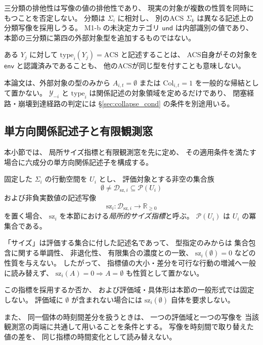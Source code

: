 \begin{remark}[三分類の位置づけ]
\label{rem:object_partition_role}
三分類の排他性は写像の値の排他性であり、
現実の対象が複数の性質を同時にもつことを否定しない。
分類は $\Sigma_i$ に相対し、
別のACS $\Sigma_k$ は異なる記述上の分類写像を採用しうる。
M1-b の未決定カテゴリ $\mathsf{und}$ は内部識別の値であり、
本節の三分類に第四の外部対象型を追加するものではない。

ある $Y_j$ に対して $\mathrm{type}_i(Y_j)=\mathrm{ACS}$ と記述することは、
ACS自身がその対象を $\mathsf{env}$ と認識済みであることも、
他のACSが同じ型を付すことも意味しない。
\end{remark}

\begin{remark}[外部対象の型と閉塞・崩壊]
\label{rem:objects_to_sec7}
本論文は、外部対象の型のみから $A_{i,t}=\emptyset$ または
$\mathrm{Col}_{i,t}=1$ を一般的な帰結として置かない。
$\mathcal Y_{-i}$ と $\mathrm{type}_i$ は関係記述の対象領域を定めるだけであり、
閉塞経路・崩壊到達経路の判定には \S\ref{sec:collapse_cond} の条件を別途用いる。
\end{remark}

\subsection{単方向関係記述子と有限観測窓}
\label{subsec:rel_unidirect}

本小節では、
局所サイズ指標と有限観測窓を先に定め、
その適用条件を満たす場合に六成分の単方向関係記述子を構成する。

\begin{definition}
\label{def:rel_size_functional}
固定した $\Sigma_i$ の行動空間を $U_i$ とし、
評価対象とする非空の集合族
\[
 \emptyset\neq\mathcal D_{\mathrm{sz},i}\subseteq\mathcal P(U_i)
\]
および非負実数値の記述写像
\[
 \mathrm{sz}_i:\mathcal D_{\mathrm{sz},i}\longrightarrow\mathbb R_{\geq0}
\]
を置く場合、
$\mathrm{sz}_i$ を本節における\emph{局所的サイズ指標}と呼ぶ。
$\mathcal P(U_i)$ は $U_i$ の冪集合である。

「サイズ」は評価する集合に付した記述名であって、
型指定のみからは
集合包含に関する単調性、
非退化性、
有限集合の濃度との一致、
$\mathrm{sz}_i(\emptyset)=0$ などの性質を与えない。
したがって、
指標値の大小・差分を可行な行動の増減へ一般に読み替えず、
$\mathrm{sz}_i(A)=0\Rightarrow A=\emptyset$ も性質として置かない。

この指標を採用するか否か、
および評価域・具体形は本節の一般形式では固定しない。
評価域に $\emptyset$ が含まれない場合には $\mathrm{sz}_i(\emptyset)$ 自体を要求しない。

また、
同一個体の時刻間差分を扱うときは、
一つの評価域と一つの写像を
当該観測窓の両端に共通して用いることを条件とする。
写像を時刻間で取り替えた値の差を、
同じ指標の時間変化として読み替えない。

\end{definition}


